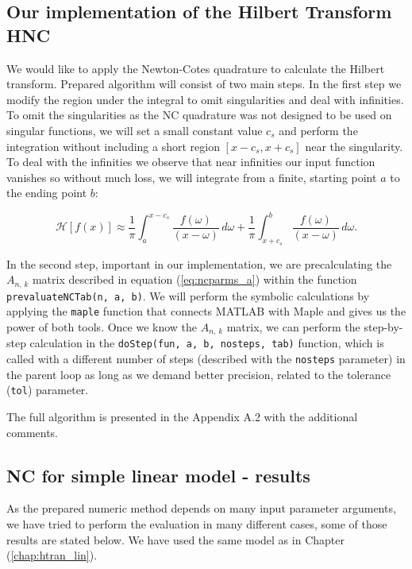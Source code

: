 \documentclass[12pt,twoside,a4paper]{article}
\numberwithin{equation}{subsection}
\numberwithin{figure}{subsection}
\begin{document}
\subsection{Our implementation of the Hilbert Transform HNC}  \label{chap:nc_hilbert_transform}

We would like to apply the Newton-Cotes quadrature to calculate the Hilbert transform. Prepared algorithm will consist of two main steps. In the first step we modify the region under the integral to omit singularities and deal with infinities. To omit the singularities as the NC quadrature was not designed to be used on singular functions, we will set a small constant value $c_s$ and perform the integration without including a short region $[x - c_s, x + c_s]$ near the singularity. To deal with the infinities we observe that near infinities our input function vanishes so without much loss, we will integrate from a finite, starting point $a$ to the ending point $b$:

\begin{equation}
	\mathcal{H}[f(x)] \approx \frac{1}{\pi} \int_{ a }^{ x - c_s } \frac{ f(\omega) }{ (x - \omega) } \, d\omega 
                           +  \frac{1}{\pi} \int_{ x + c_s }^{ b } \frac{ f(\omega) }{ (x - \omega) } \, d\omega .
\end{equation} 

In the second step, important in our implementation, we are pre\-calculating the $A_{n, \, k}$ matrix described in equation (\ref{eq:ncparms_a}) within the function \texttt{prevaluateNCTab(n, a, b)}. We will perform the symbolic calculations by applying the \texttt{maple} function that connects MATLAB with Maple and gives us the power of both tools. Once we know the $A_{n, \, k}$ matrix, we can perform the step-by-step calculation in the \texttt{doStep(fun, a, b, nosteps, tab)} function, which is called with a different number of steps (described with the \texttt{nosteps} parameter) in the parent loop as long as we demand better precision, related to the tolerance (\texttt{tol}) parameter.

The full algorithm is presented in the Appendix A.2 with the additional comments. 

\subsection{NC for simple linear model - results} \label{chap:nc_lin}

As the prepared numeric method depends on many input parameter arguments, we have tried to perform the evaluation in many different cases, some of those results are stated below. We have used the same model as in Chapter (\ref{chap:htran_lin}).
\end{document}
